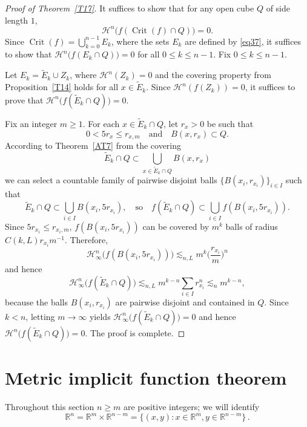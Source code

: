 \documentclass[12pt,leqno]{amsart}
\theoremstyle{definition}
\newcommand{\bbbr}{\mathbb R}
\def\H{{\mathcal H}}
\numberwithin{theorem}{section} \numberwithin{equation}{section}
\begin{document}
\begin{proof}[Proof of Theorem~\ref{T17}]
It suffices to show that for any open cube $Q$ of side length $1$,
$$
\H^n\big(f(\operatorname{Crit}(f)\cap Q)\big)=0.
$$
Since $\operatorname{Crit}(f)=\bigcup_{k=0}^{n-1} E_k$, where the sets $E_k$ are defined by \eqref{eq37}, it suffices to show that $\H^n\big(f(E_k\cap Q)\big)=0$ for all $0\leq k\leq n-1$. Fix $0\leq k\leq n-1$.

Let $E_k=\tilde{E}_k\cup Z_k$, where $\H^n(Z_k)=0$ and the covering property from Proposition~\ref{T14} holds for all $x\in \tilde{E}_k$. Since $\H^n(f(Z_k))=0$, it suffices to prove that $\H^n\big(f(\tilde{E}_k\cap Q)\big)=0$.

Fix an integer $m\geq 1$. For each $x\in\tilde{E}_k\cap Q$, let $r_x>0$ be such that
$$
0<5r_x\leq r_{x,m}
\quad
\text{and}
\quad
B(x,r_x)\subset Q.
$$
According to Theorem~\ref{AT7} from the covering
$$
\tilde{E}_k\cap Q\subset\bigcup_{x\in\tilde{E}_k\cap Q}B(x,r_x)
$$
we can select a countable family of pairwise disjoint balls $\{ B(x_i,r_{x_i})\}_{i\in I}$ such that
$$
\tilde{E}_k\cap Q\subset\bigcup_{i\in I} B(x_i,5r_{x_i}),
\quad
\text{so}
\quad
f(\tilde{E}_k\cap Q)\subset\bigcup_{i\in I} f(B(x_i,5r_{x_i})).
$$
Since $5r_{x_i}\leq r_{x_i,m}$, $f(B(x_i,5r_{x_i}))$ can be covered by $m^k$ balls of radius
$C(k,L) r_{x_i}m^{-1}$. Therefore,
$$
\H^n_\infty\big(f(B(x_i,5r_{x_i}))\big)\lesssim_{n,L} m^k\Big(\frac{r_{x_i}}{m}\Big)^n
$$
and hence
$$
\H^n_\infty\big(f(\tilde{E}_k\cap Q)\big)\lesssim_{n,L}m^{k-n}\sum_{i\in I}r_{x_i}^n\lesssim_nm^{k-n},
$$
because the balls $B(x_i,r_{x_i})$ are pairwise disjoint and contained in $Q$. Since $k<n$, letting $m\to\infty$ yields
$\H^n_\infty\big(f(\tilde{E}_k\cap Q)\big)=0$ and hence
$\H^n\big(f(\tilde{E}_k\cap Q)\big)=0$. The proof is complete.
\end{proof}

\section{Metric implicit function theorem}
\label{MIFT}

Throughout this section $n\geq m$ are positive integers; we will identify
 $$
 \bbbr^{n}=\bbbr^m\times\bbbr^{n-m}=\{(x,y)\colon x\in\bbbr^m, y \in \bbbr^{n-m}\} \, .
 $$


\end{document}

